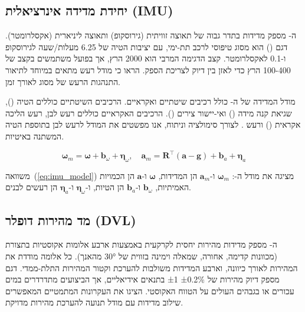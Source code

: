 \subsection{יחידת מדידה אינרציאלית (IMU)}
\label{sec:imu_model}

ה- מספק מדידות בתדר גבוה של תאוצה זוויתית (גירוסקופ) ותאוצה ליניארית (אקסלרומטר). דגם  () הוא  מסוג  טיפוסי לרכב תת-ימי, עם יציבות הטיה של 6.25 מעלות\!/\!שעה לגירוסקופ ו-0.1  לאקסלרומטר. קצב הדגימה המרבי הוא 2000 הרץ, אך בפועל משתמשים בקצב של 100-400 הרץ כדי לאזן בין דיוק לצריכת הספק. \citet{Thrun2005ProbRobotics} הראו כי מודל רעש  מתאים במיוחד לתיאור התנהגות הרעש של  מסוג  לאורך זמן.

מודל המדידה של ה- כולל רכיבים שיטתיים ואקראיים. הרכיבים השיטתיים כוללים הטיה (), שגיאת קנה מידה () ואי-יישור צירים (). הרכיבים האקראיים כוללים רעש לבן, רעש הליכה אקראית () ורעש . לצורך סימולציה וניתוח, אנו מפשטים את המודל לרעש לבן בתוספת הטיה המשתנה באיטיות.

\begin{equation}
\boldsymbol{\omega}_m = \boldsymbol{\omega} + \mathbf{b}_\omega + \boldsymbol{\eta}_\omega, \quad \mathbf{a}_m = \mathbf{R}^\top(\mathbf{a} - \mathbf{g}) + \mathbf{b}_a + \boldsymbol{\eta}_a
\label{eq:imu_model}
\end{equation}

משוואה~(\ref{eq:imu_model}) מציגה את מודל ה-: $\boldsymbol{\omega}_m$ ו-$\mathbf{a}_m$ הן המדידות, $\boldsymbol{\omega}$ ו-$\mathbf{a}$ הן הכמויות האמיתיות, $\mathbf{b}_\omega$ ו-$\mathbf{b}_a$ הן הטיות, ו-$\boldsymbol{\eta}_\omega$ ו-$\boldsymbol{\eta}_a$ הן רעשים לבנים.

\subsection{מד מהירות דופלר (DVL)}
\label{sec:dvl_model}

ה- מספק מדידות מהירות יחסית לקרקעית באמצעות ארבע אלומות אקוסטיות בתצורת  (מכוונות קדימה, אחורה, שמאלה וימינה בזווית של 30° מהאנך). כל אלומה מודדת את המהירות לאורך כיוונה, וארבע המדידות משולבות להערכת וקטור המהירות התלת-ממדי. דגם  מספק דיוק מהירות של ±0.2\% ±1  בתנאים אידיאליים, אך הביצועים מתדרדרים במים עכורים או בגבהים העולים על הטווח האקוסטי. \citet{Kalman1960} הציגו את העקרונות המתמטיים המאפשרים שילוב מדידות  עם מודל תנועה להערכת מהירות מדויקת.

